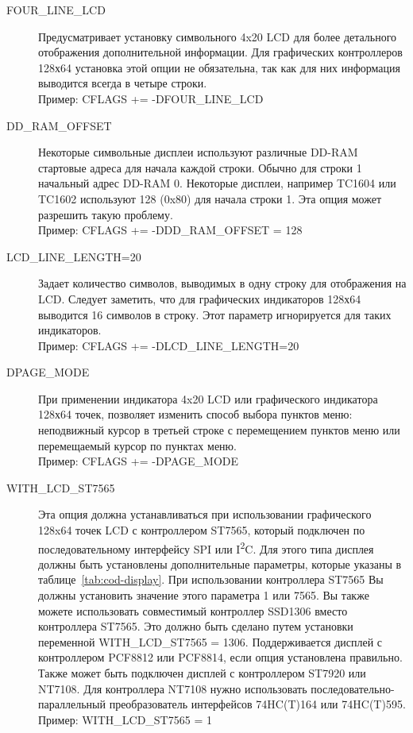 \begin{description}
  \item[FOUR\_LINE\_LCD] Предусматривает установку символьного 4x20 LCD для более детального отображения 
дополнительной информации. Для графических контроллеров 128х64 установка этой опции не обязательна, так как
для них информация выводится всегда в четыре строки.\\
Пример: CFLAGS += -DFOUR\_LINE\_LCD

  \item[DD\_RAM\_OFFSET] Некоторые символьные дисплеи используют различные DD-RAM стартовые адреса для начала каждой строки.
Обычно для строки 1 начальный адрес DD-RAM 0.
Некоторые дисплеи, например TC1604 или TC1602 используют 128 (0x80) для начала строки 1.
Эта опция может разрешить такую проблему. \\
Пример: CFLAGS += -DDD\_RAM\_OFFSET = 128

  \item[LCD\_LINE\_LENGTH=20] Задает количество символов, выводимых в одну строку для отображения на LCD.
Следует заметить, что для графических индикаторов 128х64 выводится 16 символов в строку. 
Этот параметр игнорируется для таких индикаторов. \\
Пример: CFLAGS += -DLCD\_LINE\_LENGTH=20

  \item[DPAGE\_MODE] При применении индикатора 4x20 LCD или графического индикатора 128х64 точек, позволяет 
изменить способ выбора пунктов меню: неподвижный курсор в третьей строке с перемещением пунктов меню или 
перемещаемый курсор по пунктах меню. \\
Пример: CFLAGS += -DPAGE\_MODE
 
  \item[WITH\_LCD\_ST7565] Эта опция должна устанавливаться при использовании графического 128x64 точек LCD с 
контроллером ST7565, который подключен по последовательному интерфейсу SPI или I\textsuperscript{2}C. Для этого типа дисплея должны быть 
установлены дополнительные параметры, которые указаны в таблице~\ref{tab:cod-display}.
При использовании контроллера ST7565 Вы должны установить значение этого параметра 1 или 7565. 
Вы также можете использовать совместимый контроллер SSD1306 вместо контроллера ST7565.
Это должно быть сделано путем установки переменной WITH\_LCD\_ST7565 = 1306.
Поддерживается дисплей с контроллером PCF8812 или PCF8814, если опция установлена правильно.
Также может быть подключен дисплей с контроллером ST7920 или NT7108.
Для контроллера NT7108 нужно использовать последовательно-параллельный преобразователь интерфейсов 
74HC(T)164 или 74HC(T)595. \\
Пример: WITH\_LCD\_ST7565 = 1


\end{description}
